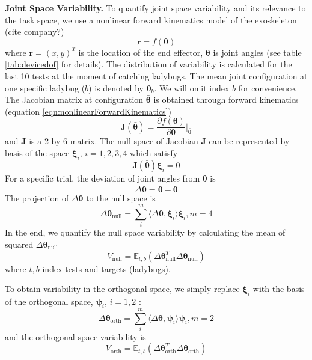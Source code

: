 \textbf{Joint Space Variability.}
To quantify joint space variability and its relevance to the task space, we use a nonlinear forward kinematics model of the exoskeleton (cite company?)
	\begin{equation}\label{eqn:nonlinearForwardKinematics}
	\bm{r} = f(\bm{\theta})
	\end{equation}
where $ \bm{r} = (x,y)^T $ is the location of the end effector, $ \bm{\theta} $ is joint angles (see table \ref{tab:devicedof} for details). 
The distribution of variability is calculated for the last 10 tests at the moment of catching ladybugs. 
The mean joint configuration at one specific ladybug ($ b $) is denoted by $ \bar{\bm{\theta}}_b $.
We will omit index $ b $ for convenience.
The Jacobian matrix at configuration $ \bar{\bm{\theta}} $ is obtained through forward kinematics (equation \ref{eqn:nonlinearForwardKinematics})
	\begin{equation}
	\bm{J}(\bar{\bm{\theta}}) = \frac{\partial f(\bm{\theta})}{\partial \bm{\theta}} \Big\rvert_{\bar{\bm{\theta}}}
	\end{equation}
and $ \bm{J} $ is a 2 by 6 matrix.
The null space of Jacobian $ \bm{J} $ can be represented by basis of the space $ \bm{\xi}_i $, $ i= 1,2,3,4 $ which satisfy
	\begin{equation}
	\bm{J}(\bar{\bm{\theta}}) \bm{\xi}_i = 0
	\end{equation}
For a specific trial, the deviation of joint angles from $ \bar{\bm{\theta}} $ is
	\begin{equation}
	\Delta\bm{\theta} = \bm{\theta} - \bar{\bm{\theta}}
	\end{equation}
The projection of $ \Delta\bm{\theta} $ to the null space is
	\begin{equation}
	\Delta\bm{\theta}_{\text{null}} = \sum_i^m \langle \Delta\bm{\theta}, \bm{\xi}_i \rangle \bm{\xi}_i, m=4
	\end{equation}
In the end, we quantify the null space variability by calculating the mean of squared $ \Delta\bm{\theta}_{\text{null}} $
	\begin{equation}
	V_{\text{null}} = \mathbb{E}_{t,b} (\Delta\bm{\theta}_{\text{null}}^T\Delta\bm{\theta}_{\text{null}})
	\end{equation}
where $ t,b $ index tests and targets (ladybugs).

To obtain variability in the orthogonal space, we simply replace $ \bm{\xi}_i $ with the basis of the orthogonal space, $ \bm{\psi}_i $, $ i= 1,2 $  :
	\begin{equation}
	\Delta\bm{\theta}_{\text{orth}} = \sum_i^m \langle \Delta\bm{\theta}, \bm{\psi}_i \rangle \bm{\psi}_i, m=2
	\end{equation}
and the orthogonal space variability is
	\begin{equation}
	V_{\text{orth}} = \mathbb{E}_{t,b} (\Delta\bm{\theta}_{\text{orth}}^T\Delta\bm{\theta}_{\text{orth}})
	\end{equation}

